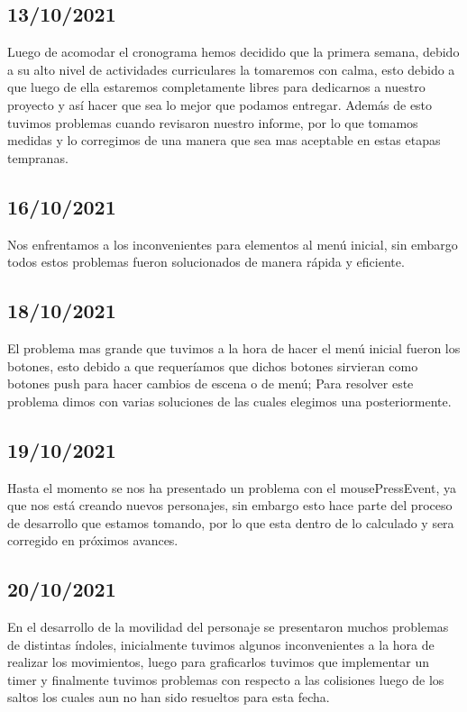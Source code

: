 \documentclass{article}
\begin{document}
    \subsection{13/10/2021}
    Luego de acomodar el cronograma hemos decidido que la primera semana, debido a su alto nivel de actividades curriculares la tomaremos con calma, esto debido a que luego de ella estaremos completamente libres para dedicarnos a nuestro proyecto y así hacer que sea lo mejor que podamos entregar. Además de esto tuvimos problemas cuando revisaron nuestro informe, por lo que tomamos medidas y lo corregimos de una manera que sea mas aceptable en estas etapas tempranas.
    
    \subsection{16/10/2021}
    Nos enfrentamos a los inconvenientes para elementos al menú inicial, sin embargo todos estos problemas fueron solucionados de manera rápida y eficiente.   
     
    \subsection{18/10/2021}
    El problema mas grande que tuvimos a la hora de hacer el menú inicial fueron los botones, esto debido a que requeríamos que dichos botones sirvieran como botones push para hacer cambios de escena o de menú; Para resolver este problema dimos con varias soluciones de las cuales elegimos una posteriormente.
    
    \subsection{19/10/2021}    
    Hasta el momento se nos ha presentado un problema con el mousePressEvent, ya que nos está creando nuevos personajes, sin embargo esto hace parte del proceso de desarrollo que estamos tomando, por lo que esta dentro de lo calculado y sera corregido en próximos avances.
    
    \subsection{20/10/2021}
    En el desarrollo de la movilidad del personaje se presentaron muchos problemas de distintas índoles, inicialmente tuvimos algunos inconvenientes a la hora de realizar los movimientos, luego para graficarlos tuvimos que implementar un timer y finalmente tuvimos problemas con respecto a las colisiones luego de los saltos los cuales aun no han sido resueltos para esta fecha.
    
\end{document}
